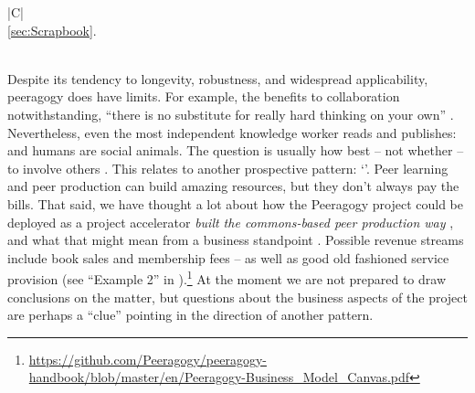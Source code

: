 \begin{table}
{\begin{tabularx}{\textwidth}{|C|}
{%
\NewcomerWN
\vspace{.28em}}\\
\hline
\vspace{-.4em} \color{Black} \ref{sec:Scrapbook}. \vspace{.28em}\\
\hline
{}\\
\hline
\end{tabularx}
}
\smallskip
\caption{What's next in the Peeragogy project\label{tab:WhatsNextSummary}}
\end{table}

Despite its tendency to longevity, robustness, and
widespread applicability, peeragogy does have limits.
For example, the benefits to collaboration notwithstanding, 
``there is no substitute for really hard
thinking on your own'' \cite{atiyah1974research}.
Nevertheless, even the most independent knowledge worker reads and
publishes: and humans are social animals.  The question is usually how
best -- not whether -- to involve others
\cite{coase1937nature,coases-penguin}.  This relates to another
prospective pattern: `'.  Peer
learning and peer production can build amazing resources, but they
don't always pay the bills.  That said, we have thought a lot about
how the Peeragogy project could be deployed as a project accelerator
\emph{built the commons-based peer production way}
\cite{krowne+building+2003}, and what that might mean from a business
standpoint \cite{building-peeragogy-accelerator}.  Possible revenue
streams include book sales and membership fees -- as well as good old
fashioned service provision (see ``Example 2'' in
).\footnote{\url{https://github.com/Peeragogy/peeragogy-handbook/blob/master/en/Peeragogy-Business_Model_Canvas.pdf}}
At the moment we are not prepared to draw conclusions on the matter,
but questions about the business aspects of the project are perhaps a
``clue'' pointing in the direction of another pattern.

